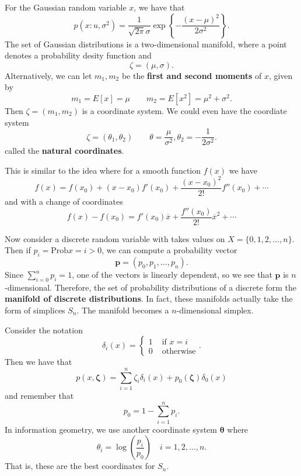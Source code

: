 \documentclass[12pt,letterpaper,boxed]{maths_v5}
\theoremstyle{definition}
\begin{document}
    For the Gaussian random variable $x$, we have that 
    \[
        p(x:u, \sigma^2) 
        = \frac{1}{\sqrt{2\pi}\sigma}\exp\left\{-\dfrac{(x-\mu)^2}{2\sigma^2}\right\}.
    \]
    The set of Gaussian distributions is a two-dimensional manifold, where a point denotes a probability 
    desity function and 
    \[
        \zeta = (\mu, \sigma).
    \]
    Alternatively, we can let $m_1, m_2$ be the \textbf{first and second moments} of
    $x$, given by 
    \[
        m_1 = E[x] = \mu \qquad m_2  = E[x^2] = \mu^2 + \sigma^2.
    \]
    Then $\zeta= (m_1, m_2)$ is a coordinate system. We could even have the coordiate system 
    \[
        \zeta = (\theta_1, \theta_2) \qquad \theta = \frac{\mu}{\sigma^2}, \theta_2 = -\frac{1}{2\sigma^2}.
    \]
    called the \textbf{natural coordinates}.

    This is similar to the idea where for a smooth function $f(x)$ we have 
    \[
        f(x) = f(x_0) + (x - x_0)f'(x_0) + \frac{(x-x_0)^2}{2!}f''(x_0) + \cdots
    \]
    and with a change of coordinates
    \[
        f(x) - f(x_0) = f'(x_0)\overline{x} + \frac{f''(x_0)}{2!}\overline{x}^2 + \cdots 
    \]

    Now consider a discrete random variable with takes values on $X = \{0, 1, 2, \dots, n\}$. 
    Then if $p_i = \text{Prob}{x = i} > 0$, we can compute a probability vector 
    \[
        \bm{p} = (p_0, p_1, \dots, p_n).
    \]
    Since $\displaystyle \sum_{i = 0}^{n}p_i = 1$, one of the vectors is linearly 
    dependent, so we see  that $\bm{p}$ is $n$-dimensional. Therefore, the set of probability 
    distributions  of a discrete form the \textbf{manifold of discrete distributions}. 
    In fact, these manifolds actually 
    take the form of simplices $S_n$. The manifold becomes a $n$-dimensional simplex. 
    
    Consider the notation 
    \[
        \delta_i(x) = 
        \begin{cases}
            1 & \text{ if } x = i\\
            0 & \text{ otherwise}
        \end{cases}.
    \]
    Then we have that 
    \[
        p(x, \bm{\zeta}) = 
        \sum_{i = 1}^n\zeta_i\delta_i(x) + p_0(\bm{\zeta})\delta_0(x)
    \]
    and remember that 
    \[
        p_0 = 1 - \sum_{i =1}^{n}p_i.   
    \]
    In information geometry, we use another coordinate system $\bm{\theta}$ where 
    \[
        \theta_i = \log\left( \frac{p_i}{p_0} \right) \quad i = 1,2, \dots, n.
    \]
    That is, these are the best coordinates for $S_n$. 
\end{document}

